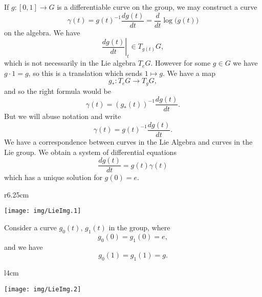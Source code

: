 If $g\colon[0,1]\to G$ is a differentiable curve on the group, we
may construct a curve
\begin{equation}
\gamma(t)=g(t)^{-1}\frac{dg(t)}{dt}=\frac{d}{dt}\log\big(g(t)\big)
\end{equation}
on the algebra. We have
\begin{equation}
\left.\frac{dg(t)}{dt}\right|_{t}\in T_{g(t)}G,
\end{equation}
which is not necessarily in the Lie algebra $T_{e}G$. However for
some $g\in G$ we have $g\cdot 1=g$, so this is a translation
which sends $1\mapsto g$. We have a map
\begin{equation}
g_{*}\colon T_{e}G\to T_{g}G,
\end{equation}
and so the right formula would be
\begin{equation}
\gamma(t)=\left(g_{*}(t)\right)^{-1}\frac{dg(t)}{dt}.
\end{equation}
But we will abuse notation and write
\begin{equation}
\gamma(t)=g(t)^{-1}\frac{dg(t)}{dt}.
\end{equation}
We have a correspondence between curves in the Lie Algebra and
curves in the Lie group. We obtain a system of differential
equations 
\begin{equation}
\frac{dg(t)}{dt}=g(t)\gamma(t)
\end{equation}
which has a unique solution for $g(0)=e$.

\begin{wrapfigure}[10]{r}{6.25cm}  
  \begin{center}
    \texttt{[image: img/LieImg.1]}
  \end{center}
  \vspace{-20pt}
\end{wrapfigure}

Consider a curve $g_{0}(t)$, $g_{1}(t)$ in the group, where
\begin{equation}
g_{0}(0)=g_{1}(0)=e,
\end{equation}
and we have
\begin{equation}
g_{0}(1)=g_{1}(1)=g.
\end{equation}
\begin{wrapfigure}[6]{l}{4cm}
  \vspace{-20pt}
  \begin{center}
    \texttt{[image: img/LieImg.2]}
  \end{center}
  \vspace{-20pt}
\end{wrapfigure}

